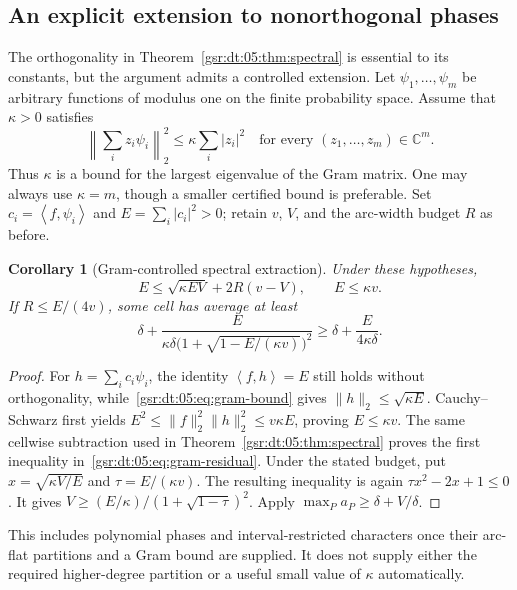 \documentclass[11pt,letterpaper]{article}
\numberwithin{equation}{section}
\newtheorem{corollary}[theorem]{Corollary}
\theoremstyle{definition}
\theoremstyle{remark}
\newcommand{\C}{\mathbb C}
\newcommand{\1}{\mathbf 1}
\newcommand{\ip}[2]{\left\langle #1,#2\right\rangle}
\begin{document}
\subsection{An explicit extension to nonorthogonal phases}
The orthogonality in Theorem~\ref{gsr:dt:05:thm:spectral} is essential to its constants, but the argument admits a controlled extension. Let $\psi_1,\ldots,\psi_m$ be arbitrary functions of modulus one on the finite probability space. Assume that $\kappa>0$ satisfies
\begin{equation}
 \left\|\sum_i z_i\psi_i\right\|_2^2\leq\kappa\sum_i|z_i|^2
 \quad\text{for every }(z_1,\ldots,z_m)\in\C^m.
 \label{gsr:dt:05:eq:gram-bound}
\end{equation}
Thus $\kappa$ is a bound for the largest eigenvalue of the Gram matrix. One may always use $\kappa=m$, though a smaller certified bound is preferable. Set $c_i=\ip f{\psi_i}$ and $E=\sum_i|c_i|^2>0$; retain $v$, $V$, and the arc-width budget $R$ as before.

\begin{corollary}[Gram-controlled spectral extraction]
\label{gsr:dt:05:cor:gram}
Under these hypotheses,
\begin{equation}
 E\leq\sqrt{\kappa EV}+2R(v-V),\qquad E\leq\kappa v.
 \label{gsr:dt:05:eq:gram-residual}
\end{equation}
If $R\leq E/(4v)$, some cell has average at least
\begin{equation}
 \delta+\frac{E}{\kappa\delta\bigl(1+\sqrt{1-E/(\kappa v)}\bigr)^2}
 \geq\delta+\frac{E}{4\kappa\delta}.
 \label{gsr:dt:05:eq:gram-increment}
\end{equation}
\end{corollary}
\begin{proof}
For $h=\sum_i c_i\psi_i$, the identity $\ip f h=E$ still holds without orthogonality, while~\eqref{gsr:dt:05:eq:gram-bound} gives $\|h\|_2\leq\sqrt{\kappa E}$. Cauchy--Schwarz first yields $E^2\leq\|f\|_2^2\|h\|_2^2\leq v\kappa E$, proving $E\leq\kappa v$. The same cellwise subtraction used in Theorem~\ref{gsr:dt:05:thm:spectral} proves the first inequality in~\eqref{gsr:dt:05:eq:gram-residual}. Under the stated budget, put $x=\sqrt{\kappa V/E}$ and $\tau=E/(\kappa v)$. The resulting inequality is again $\tau x^2-2x+1\leq0$. It gives $V\geq(E/\kappa)/(1+\sqrt{1-\tau})^2$. Apply $\max_P a_P\geq\delta+V/\delta$.
\end{proof}

This includes polynomial phases and interval-restricted characters once their arc-flat partitions and a Gram bound are supplied. It does not supply either the required higher-degree partition or a useful small value of $\kappa$ automatically.
\end{document}
